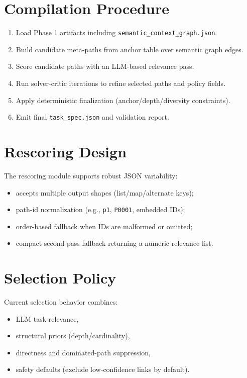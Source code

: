 \documentclass[11pt]{article}
\begin{document}
\section{Compilation Procedure}
\begin{enumerate}[leftmargin=1.8em]
  \item Load Phase 1 artifacts including \texttt{semantic\_context\_graph.json}.
  \item Build candidate meta-paths from anchor table over semantic graph edges.
  \item Score candidate paths with an LLM-based relevance pass.
  \item Run solver-critic iterations to refine selected paths and policy fields.
  \item Apply deterministic finalization (anchor/depth/diversity constraints).
  \item Emit final \texttt{task\_spec.json} and validation report.
\end{enumerate}

\section{Rescoring Design}
The rescoring module supports robust JSON variability:
\begin{itemize}[leftmargin=1.5em]
  \item accepts multiple output shapes (list/map/alternate keys);
  \item path-id normalization (e.g., \texttt{p1}, \texttt{P0001}, embedded IDs);
  \item order-based fallback when IDs are malformed or omitted;
  \item compact second-pass fallback returning a numeric relevance list.
\end{itemize}

\section{Selection Policy}
Current selection behavior combines:
\begin{itemize}[leftmargin=1.5em]
  \item LLM task relevance,
  \item structural priors (depth/cardinality),
  \item directness and dominated-path suppression,
  \item safety defaults (exclude low-confidence links by default).
\end{itemize}
\end{document}
